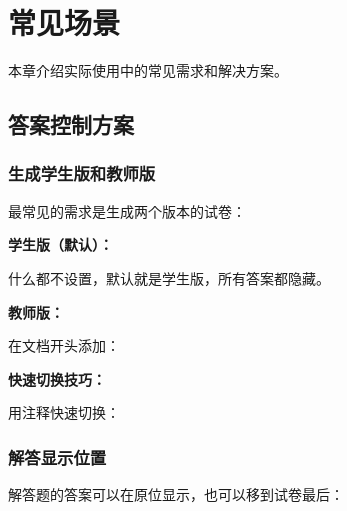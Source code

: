 
\section{常见场景}

本章介绍实际使用中的常见需求和解决方案。

\subsection{答案控制方案}

\subsubsection{生成学生版和教师版}

最常见的需求是生成两个版本的试卷：

\textbf{学生版（默认）：}

什么都不设置，默认就是学生版，所有答案都隐藏。

\textbf{教师版：}

在文档开头添加：

\begin{latexcode}
\end{latexcode}

\textbf{快速切换技巧：}

用注释快速切换：

\begin{latexcode}
\end{latexcode}

\subsubsection{解答显示位置}

解答题的答案可以在原位显示，也可以移到试卷最后：

\begin{latexcode}
\end{latexcode}

